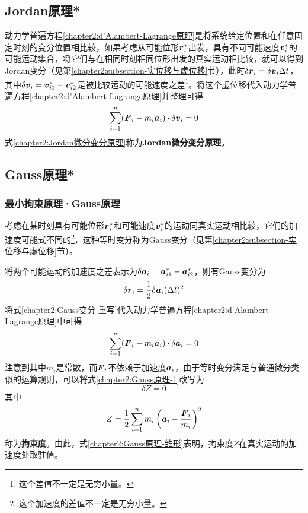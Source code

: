 \subsection{Jordan原理*}\label{chapter2:subsection-Jordan原理}

动力学普遍方程\eqref{chapter2:d'Alambert-Lagrange原理}是将系统给定位置和在任意固定时刻的变分位置相比较，如果考虑从可能位形$\boldsymbol{r}_i^*$出发，具有不同可能速度$\boldsymbol{v}_i^*$的可能运动集合，将它们与在相同时刻相同位形出发的真实运动相比较，就可以得到Jordan变分（见第\ref{chapter2:subsection-实位移与虚位移}节），此时$\delta\boldsymbol{r}_i=\delta \boldsymbol{v}_i\Delta t$，其中$\delta\boldsymbol{v}_i=\boldsymbol{v}_{i1}^*-\boldsymbol{v}_{i2}^*$是被比较运动的可能速度之差\footnote{这个差值不一定是无穷小量。}。将这个虚位移代入动力学普遍方程\eqref{chapter2:d'Alambert-Lagrange原理}并整理可得
\begin{equation}
	\sum_{i=1}^n (\boldsymbol{F}_i-m_i\boldsymbol{a}_i)\cdot \delta \boldsymbol{v}_i = 0
	\label{chapter2:Jordan微分变分原理}
\end{equation}
式\eqref{chapter2:Jordan微分变分原理}称为{\bf Jordan微分变分原理}。

\subsection{Gauss原理*}

\subsubsection{最小拘束原理·Gauss原理}\label{chapter2:subsubsection-最小拘束原理·Gauss原理}

考虑在某时刻具有可能位形$\boldsymbol{r}_i^*$和可能速度$\boldsymbol{v}_i^*$的运动同真实运动相比较，它们的加速度可能式不同的\footnote{这个加速度的差值不一定是无穷小量。}，这种等时变分称为Gauss变分（见第\ref{chapter2:subsection-实位移与虚位移}节）。

将两个可能运动的加速度之差表示为$\delta\boldsymbol{a}_i=\boldsymbol{a}_{i1}^*-\boldsymbol{a}_{i2}^*$，则有Gauss变分为
\begin{equation}
	\delta\boldsymbol{r}_i = \frac12 \delta\boldsymbol{a}_i(\Delta t)^2
	\label{chapter2:Gauss变分-重写}
\end{equation}
将式\eqref{chapter2:Gauss变分-重写}代入动力学普遍方程\eqref{chapter2:d'Alambert-Lagrange原理}中可得
\begin{equation}
	\sum_{i=1}^n (\boldsymbol{F}_i-m_i\boldsymbol{a}_i)\cdot \delta\boldsymbol{a}_i=0
	\label{chapter2:Gauss原理-1}
\end{equation}
注意到其中$m_i$是常数，而$\boldsymbol{F}_i$不依赖于加速度$\boldsymbol{a}_i$，由于等时变分满足与普通微分类似的运算规则，可以将式\eqref{chapter2:Gauss原理-1}改写为
\begin{equation}
	\delta Z = 0
	\label{chapter2:Gauss原理-雏形}
\end{equation}
其中
\begin{equation}
	Z = \frac12 \sum_{i=1}^nm_i\left(\boldsymbol{a}_i-\frac{\boldsymbol{F}_i}{m_i}\right)^2
	\label{chapter2:拘束度定义}
\end{equation}
称为{\bf 拘束度}。由此，式\eqref{chapter2:Gauss原理-雏形}表明，拘束度$Z$在真实运动的加速度处取驻值。

